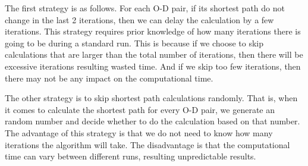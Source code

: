 The first strategy is as follows.
For each O-D pair, if its shortest path do not change in the last 2 iterations,
then we can delay the calculation by a few iterations.
This strategy requires prior knowledge of how many iterations there is going to be during a standard run.
This is because if we choose to skip calculations that are larger than the total number of iterations,
then there will be excessive iterations resulting wasted time.
And if we skip too few iterations,
then there may not be any impact on the computational time.

The other strategy is to skip shortest path calculations randomly.
That is, when it comes to calculate the shortest path for every O-D pair,
we generate an random number and decide whether to do the calculation based on that number.
The advantage of this strategy is that we do not need to know how many iterations the algorithm will take.
The disadvantage is that the computational time can vary between different runs,
resulting unpredictable results.

\begin{comment}
\section{Preprocessing and More}
Preprocessing - trade memory to get faster time.
We can either do a fast preprocessing between iterations to make query in each iteration (so combined speed is still faster) 
or do a long preprocessing at the start and use the computed heuristic values
\begin{itemize}
    \item A* landmarks and triangle inequality (ALT)
    \item Reach-based routing 
    \item ALT + Reach
    \item Geometric Containers
    \item Arc Flags
\end{itemize}

If we have more data on the network we can use
algorithms that use hierarchies.
Consider roads with higher speed first: use a hierarchy of subgraphs.
\begin{itemize}
    \item Radius search.
    \item multi-level approach
    \item highway hierarchies
\end{itemize}
\end{comment}

